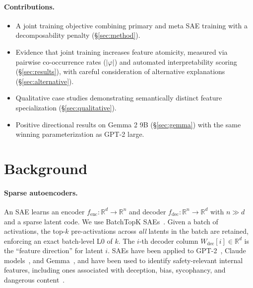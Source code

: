 \documentclass{article} %
\begin{document}
\paragraph{Contributions.}
\begin{itemize}[topsep=2pt, itemsep=1pt]
  \item A joint training objective combining primary and meta SAE training
    with a decomposability penalty (\S\ref{sec:method}).
  \item Evidence that joint training increases feature atomicity, measured
    via pairwise co-occurrence rates ($|\varphi|$) and automated interpretability
    scoring (\S\ref{sec:results}), with careful consideration of alternative
    explanations (\S\ref{sec:alternative}).
  \item Qualitative case studies demonstrating semantically
    distinct feature specialization (\S\ref{sec:qualitative}).
  \item Positive directional results on Gemma 2 9B (\S\ref{sec:gemma}) with the
  same winning parameterization as GPT-2 large.
\end{itemize}

\section{Background}
\label{sec:background}

\paragraph{Sparse autoencoders.}
An SAE learns an encoder $f_\text{enc}:\mathbb{R}^d\!\to\!\mathbb{R}^n$ and
decoder $f_\text{dec}:\mathbb{R}^n\!\to\!\mathbb{R}^d$ with $n \gg d$ and a
sparse latent code.
We use BatchTopK SAEs~\citep{gao2024scaling}. Given a batch of activations,
the top-$k$ pre-activations across \emph{all} latents in the batch are retained,
enforcing an exact batch-level L0 of $k$.
The $i$-th decoder column $W_\text{dec}[i] \in \mathbb{R}^d$ is the ``feature
direction'' for latent $i$.
SAEs have been applied to GPT-2~\citep{cunningham2023sparse}, Claude models~\citep{templeton2024scaling},
and Gemma~\citep{lieberum2024gemma}, and have been used to identify safety-relevant internal features,
including ones associated with deception, bias, sycophancy, and dangerous content~\citep{templeton2024scaling}.
\end{document}
